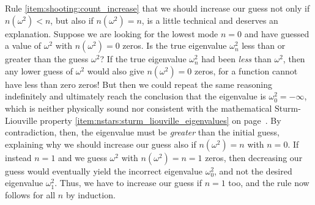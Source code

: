 Rule \ref{item:shooting:count_increase} that we should increase our guess not only if $n(\omega^2) < n$, but also if $n(\omega^2) = n$, is a little technical and deserves an explanation.
Suppose we are looking for the lowest mode $n = 0$ and have guessed a value of $\omega^2$ with $n(\omega^2) = 0$ zeros.
Is the true eigenvalue $\omega_n^2$ less than or greater than the guess $\omega^2$?
If the true eigenvalue $\omega_n^2$ had been \emph{less} than $\omega^2$, then any lower guess of $\omega^2$ would also give $n(\omega^2) = 0$ zeros, for a function cannot have less than zero zeros!
But then we could repeat the same reasoning indefinitely and ultimately reach the conclusion that the eigenvalue is $\omega_0^2 = -\infty$, which is neither physically sound nor consistent with the mathematical Sturm-Liouville property \ref{item:nstars:sturm_liouville_eigenvalues} on page~\pageref{item:nstars:sturm_liouville_eigenvalues}.
By contradiction, then, the eigenvalue must be \emph{greater} than the initial guess, explaining why we should increase our guess also if $n(\omega^2) = n$ with $n = 0$.
If instead $n = 1$ and we guess $\omega^2$ with $n(\omega^2) = n = 1$ zeros, then decreasing our guess would eventually yield the incorrect eigenvalue $\omega_0^2$, and not the desired eigenvalue $\omega_1^2$.
Thus, we have to increase our guess if $n=1$ too, and the rule now follows for all $n$ by induction.

